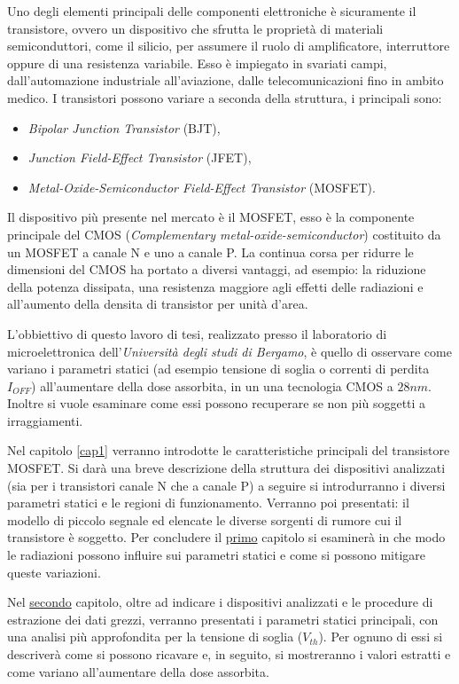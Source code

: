 Uno degli elementi principali delle componenti elettroniche è sicuramente il transistore, ovvero un dispositivo che sfrutta le proprietà di materiali semiconduttori, come il silicio, per assumere il ruolo di amplificatore, interruttore oppure di una resistenza variabile.
Esso è impiegato in svariati campi, dall'automazione industriale all'aviazione, dalle telecomunicazioni fino in ambito medico.
I transistori possono variare a seconda della struttura, i principali sono:
\begin{itemize}
    \item \textit{Bipolar Junction Transistor} (BJT),
    \item \textit{Junction Field-Effect Transistor} (JFET),
    \item \textit{Metal-Oxide-Semiconductor Field-Effect Transistor} (MOSFET).
\end{itemize}
Il dispositivo più presente nel mercato è il MOSFET, esso è la componente principale del CMOS (\textit{Complementary metal-oxide-semiconductor}) costituito da un MOSFET a canale N e uno a canale P. La continua corsa per ridurre le dimensioni del CMOS ha portato a diversi vantaggi, ad esempio: la riduzione della potenza dissipata, una resistenza maggiore agli effetti delle radiazioni e all'aumento della densita di transistor per unità d'area.  

\vspace*{0.5cm}

L'obbiettivo di questo lavoro di tesi, realizzato presso il laboratorio di microelettronica dell'\textit{Università degli studi di Bergamo}, è quello di osservare come variano i parametri statici (ad esempio tensione di soglia o correnti di perdita $I_{OFF}$) all'aumentare della dose assorbita, in un una tecnologia CMOS a $28nm$. Inoltre si vuole esaminare come essi possono recuperare se non più soggetti a irraggiamenti.     

\vspace*{0.5cm}

Nel capitolo \ref{cap1} verranno introdotte le caratteristiche principali del transistore MOSFET.
Si darà una breve descrizione della struttura dei dispositivi analizzati (sia per i transistori canale N che a canale P) a seguire si introdurranno i diversi parametri statici e le regioni di funzionamento. Verranno poi presentati: il modello di piccolo segnale ed elencate le diverse sorgenti di rumore cui il transistore è soggetto. Per concludere il \hyperref[cap1]{primo} capitolo si esaminerà in che modo le radiazioni possono influire sui parametri statici e come si possono mitigare queste variazioni.

Nel \hyperref[cap2]{secondo} capitolo, oltre ad indicare i dispositivi analizzati e le procedure di estrazione dei dati grezzi, verranno presentati i parametri statici principali, con una analisi più approfondita per la tensione di soglia ($V_{th}$). Per ognuno di essi si descriverà come si possono ricavare e, in seguito, si mostreranno i valori estratti e come variano all'aumentare della dose assorbita.   
